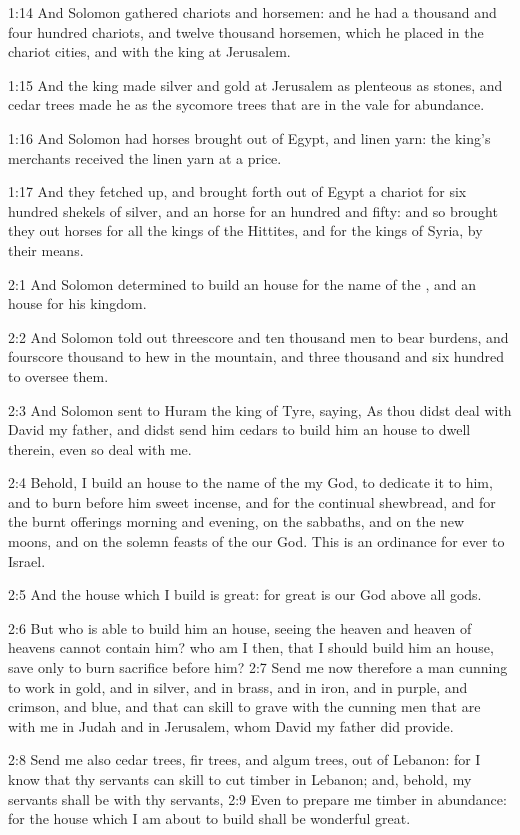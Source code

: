 1:14 And Solomon gathered chariots and horsemen: and he had a thousand
and four hundred chariots, and twelve thousand horsemen, which he
placed in the chariot cities, and with the king at Jerusalem.

1:15 And the king made silver and gold at Jerusalem as plenteous as
stones, and cedar trees made he as the sycomore trees that are in the
vale for abundance.

1:16 And Solomon had horses brought out of Egypt, and linen yarn: the
king's merchants received the linen yarn at a price.

1:17 And they fetched up, and brought forth out of Egypt a chariot for
six hundred shekels of silver, and an horse for an hundred and fifty:
and so brought they out horses for all the kings of the Hittites, and
for the kings of Syria, by their means.

2:1 And Solomon determined to build an house for the name of the \LORD,
and an house for his kingdom.

2:2 And Solomon told out threescore and ten thousand men to bear
burdens, and fourscore thousand to hew in the mountain, and three
thousand and six hundred to oversee them.

2:3 And Solomon sent to Huram the king of Tyre, saying, As thou didst
deal with David my father, and didst send him cedars to build him an
house to dwell therein, even so deal with me.

2:4 Behold, I build an house to the name of the \LORD my God, to
dedicate it to him, and to burn before him sweet incense, and for the
continual shewbread, and for the burnt offerings morning and evening,
on the sabbaths, and on the new moons, and on the solemn feasts of the
\LORD our God. This is an ordinance for ever to Israel.

2:5 And the house which I build is great: for great is our God above
all gods.

2:6 But who is able to build him an house, seeing the heaven and
heaven of heavens cannot contain him? who am I then, that I should
build him an house, save only to burn sacrifice before him?  2:7 Send
me now therefore a man cunning to work in gold, and in silver, and in
brass, and in iron, and in purple, and crimson, and blue, and that can
skill to grave with the cunning men that are with me in Judah and in
Jerusalem, whom David my father did provide.

2:8 Send me also cedar trees, fir trees, and algum trees, out of
Lebanon: for I know that thy servants can skill to cut timber in
Lebanon; and, behold, my servants shall be with thy servants, 2:9 Even
to prepare me timber in abundance: for the house which I am about to
build shall be wonderful great.

